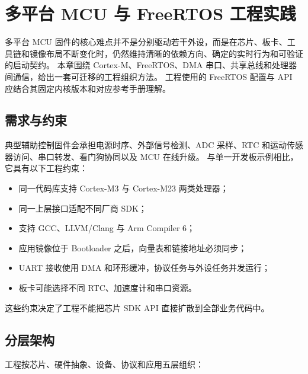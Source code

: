 \chapter{多平台 MCU 与 FreeRTOS 工程实践}
\label{chap:case-dvrapp-mcu}

多平台 MCU 固件的核心难点并不是分别驱动若干外设，而是在芯片、板卡、工具链和镜像布局不断变化时，仍然维持清晰的依赖方向、确定的实时行为和可验证的启动契约。
本章围绕 Cortex-M、FreeRTOS、DMA 串口、共享总线和处理器间通信，给出一套可迁移的工程组织方法。
工程使用的 FreeRTOS 配置与 API 应结合其固定内核版本和对应参考手册理解\cite{freertos-reference}。

\section{需求与约束}

典型辅助控制固件会承担电源时序、外部信号检测、ADC 采样、RTC 和运动传感器访问、串口转发、看门狗协同以及 MCU 在线升级。
与单一开发板示例相比，它具有以下工程约束：
\begin{itemize}
  \item 同一代码库支持 Cortex-M3 与 Cortex-M23 两类处理器；
  \item 同一上层接口适配不同厂商 SDK；
  \item 支持 GCC、LLVM/Clang 与 Arm Compiler 6；
  \item 应用镜像位于 Bootloader 之后，向量表和链接地址必须同步；
  \item UART 接收使用 DMA 和环形缓冲，协议任务与外设任务并发运行；
  \item 板卡可能选择不同 RTC、加速度计和串口资源。
\end{itemize}

这些约束决定了工程不能把芯片 SDK API 直接扩散到全部业务代码中。

\section{分层架构}

工程按芯片、硬件抽象、设备、协议和应用五层组织：

\begin{center}
\end{center}

